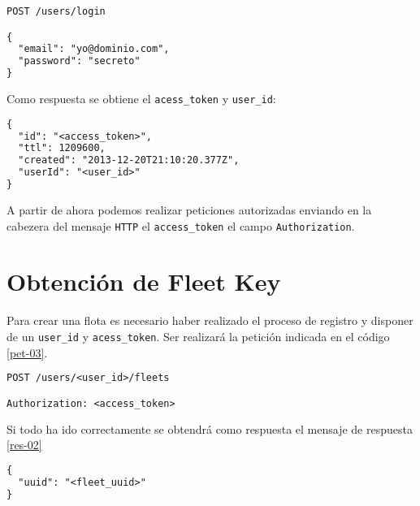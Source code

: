 \begin{minipage}{\textwidth}
\begin{lstlisting}[language=TeX,caption={Petición de login}, breaklines=true, label=pet-02]
POST /users/login

{
  "email": "yo@dominio.com",
  "password": "secreto"
}
\end{lstlisting}
\end{minipage}

Como respuesta se obtiene el \texttt{acess\_token} y \texttt{user\_id}:

\begin{minipage}{\textwidth}
\begin{lstlisting}[language=TeX,caption={Respuesta a login}, breaklines=true, label=res-01]
{
  "id": "<access_token>",
  "ttl": 1209600,
  "created": "2013-12-20T21:10:20.377Z",
  "userId": "<user_id>"
}
\end{lstlisting}
\end{minipage}

A partir de ahora podemos realizar peticiones autorizadas enviando en la
cabezera del mensaje \texttt{HTTP} el \texttt{access\_token} el campo
  \texttt{Authorization}.

\section{Obtención de Fleet Key}

Para crear una flota es necesario haber realizado el proceso de registro y
disponer de un \texttt{user\_id} y \texttt{acess\_token}. Ser realizará la
petición indicada en el código \ref{pet-03}.

\begin{minipage}{\textwidth}
\begin{lstlisting}[language=TeX,caption={Creación de \texttt{fleet\_key}}, breaklines=true, label=pet-03]
POST /users/<user_id>/fleets

Authorization: <access_token>
\end{lstlisting}
\end{minipage}

Si todo ha ido correctamente se obtendrá como respuesta el mensaje de respuesta
\ref{res-02}

\begin{minipage}{\textwidth}
\begin{lstlisting}[language=TeX,caption={Obtencion de \texttt{fleet\_key}}, breaklines=true, label=res-02]
{
  "uuid": "<fleet_uuid>"
}
\end{lstlisting}
\end{minipage}

